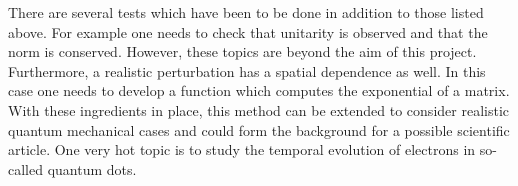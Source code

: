 \documentclass[10pt]{revtex4}
\begin{document}
There are several tests which have been to be done in addition to those listed above. 
For example one needs to check
that unitarity is observed and that the norm is conserved. However, these topics
are beyond the aim of this project. Furthermore, a realistic perturbation has
a spatial dependence as well. In this case one needs to develop a function
which computes the exponential of a matrix. With these ingredients in place, this method can be extended to consider realistic quantum mechanical cases and could form the background for a possible scientific article.
One very hot topic is to study the temporal evolution of electrons in so-called quantum dots. 
\end{document}
